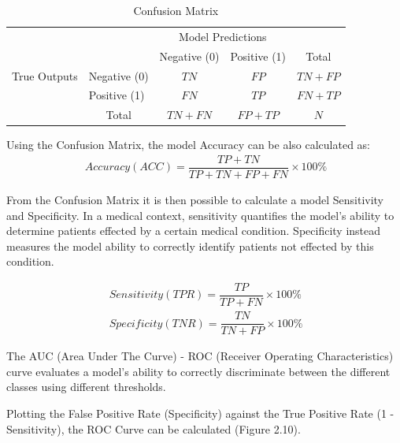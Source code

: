 {
\begin{table}[h!]
\centering
\begin{tabular}{l|l|c|c|c}
\multicolumn{2}{c}{}&\multicolumn{2}{c}{Model Predictions}&\\
\cline{3-4}
\multicolumn{2}{c|}{}&Negative (0)&Positive (1)&\multicolumn{1}{c}{Total}\\
\cline{2-4}
\multirow{}{}{True Outputs}& Negative (0) & $TN$ & $FP$ & $TN+FP$\\
\cline{2-4}
& Positive (1) & $FN$ & $TP$ & $FN+TP$\\
\cline{2-4}
\multicolumn{1}{c}{} & \multicolumn{1}{c}{Total} & \multicolumn{1}{c}{$TN+FN$} & \multicolumn{    1}{c}{$FP+TP$} & \multicolumn{1}{c}{$N$}\\
\end{tabular}
\caption{Confusion Matrix}
\label{table:1}
\end{table}
}


Using the Confusion Matrix, the model Accuracy can be also calculated as:
\begin{align}
\ Accuracy (ACC) = \dfrac{TP + TN}{TP + TN + FP + FN}\times100\% 
\end{align}

From the Confusion Matrix it is then possible to calculate a model Sensitivity and Specificity. In a medical context, sensitivity quantifies the model's ability to determine patients effected by a certain medical condition. Specificity instead measures the model ability to correctly identify patients not effected by this condition.

\begin{align}
\ Sensitivity (TPR) = \dfrac{TP}{TP + FN}\times100\% \label{eq:1} \\
\ Specificity (TNR)  = \dfrac{TN}{TN + FP}\times100\%
\end{align}

The AUC (Area Under The Curve) - ROC (Receiver Operating Characteristics) curve evaluates a model's ability to correctly discriminate between the different classes using different thresholds. 

Plotting the False Positive Rate (Specificity) against the  True Positive Rate (1 - Sensitivity), the ROC Curve can be calculated (Figure 2.10).

